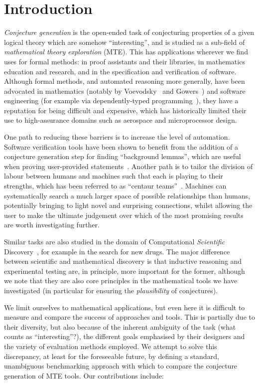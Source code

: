 \section{Introduction}
\label{intro}

\emph{Conjecture generation} is the open-ended task of conjecturing properties
of a given logical theory which are somehow ``interesting'', and is
studied as a sub-field of \emph{mathematical theory exploration} (MTE). This has
applications wherever we find uses for formal methods: in proof assistants and
their libraries, in mathematics education and research, and in the specification
and verification of software. Although formal methods, and automated reasoning
more generally, have been advocated in mathematics (notably by
Voevodsky~\cite{voevodsky2010univalent} and Gowers~\cite{ganesalingam2013fully})
and software engineering (for example via dependently-typed
programming~\cite{McKinna:2006}), they have a reputation for being difficult and
expensive, which has historically limited their use to high-assurance domains
such as aerospace and microprocessor design.

One path to reducing these barriers is to increase the level of automation.
Software verification tools have been shown to benefit from the addition of a
conjecture generation step for finding ``background lemmas'', which are useful
when proving user-provided statements~\cite{Claessen.Johansson.Rosen.ea:2013}.
Another path is to tailor the division of labour between humans and machines
such that each is playing to their strengths, which has been referred to as
``centaur teams''~\cite{harari2017reboot,davenport2015beyond}. Machines can
systematically search a much larger space of possible relationships than humans,
potentially bringing to light novel and surprising connections, whilst allowing
the user to make the ultimate judgement over which of the most promising results
are worth investigating further.

Similar tasks are also studied in the domain of Computational \emph{Scientific}
Discovery~\cite{king2004functional,Williams20141289,schmidt2009distilling}, for
example in the search for new drugs. The major difference between scientific and
mathematical discovery is that inductive reasoning and experimental testing are,
in principle, more important for the former, although we note that they are also
core principles in the mathematical tools we have investigated (in particular
for ensuring the \emph{plausibility} of conjectures).

We limit ourselves to mathematical applications, but even here it is difficult
to measure and compare the success of approaches and tools. This is partially
due to their diversity, but also because of the inherent ambiguity of the task
(what counts as ``interesting''?), the different goals emphasised by their
designers and the variety of evaluation methods employed. We attempt to solve
this discrepancy, at least for the foreseeable future, by defining a standard,
unambiguous benchmarking approach with which to compare the conjecture
generation of MTE tools. Our contributions include:

